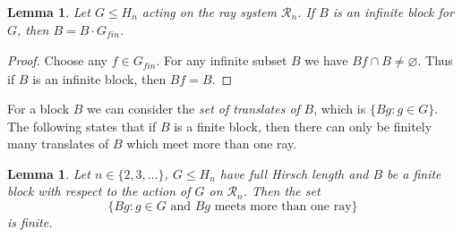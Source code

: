 \documentclass[11pt,a4paper]{amsart}
\renewcommand{\emptyset}{\varnothing}
\newtheorem{lemma}[theorem]{Lemma}
\theoremstyle{definition}
\theoremstyle{remark}
\newcommand{\Ra}{\mathcal{R}}
\newcommand{\gfin}{G_{\textit{fin}}}
\begin{document}
\begin{lemma}\label{4.3} Let $G \leq H_n$ acting on the ray system $\Ra_n$. 
If $B$ is an infinite block for $G$, then $B=B\cdot\gfin$.
\end{lemma}
\begin{proof}
Choose any $f\in \gfin$. For any infinite subset $B$ we have $Bf\cap B\not=\emptyset$. Thus if $B$ is an infinite block, then $Bf=B$.
\end{proof}
For a block $B$ we can consider the \emph{set of translates of} $B$, which is $\{Bg : g\in G\}$. The following states that if $B$ is a finite block, then there can only be finitely many translates of $B$ which meet more than one ray.
\begin{lemma}\label{4.5}
Let $n\in \{2, 3, \ldots\}$, $G\le H_n$ have full Hirsch length and $B$ be a finite block with respect to the action of $G$ on $\Ra_n$. Then the set $$\{Bg : g\in G\textrm{ and }Bg\textrm{ meets more than one ray}\}$$ is finite.
\end{lemma}
\end{document}
